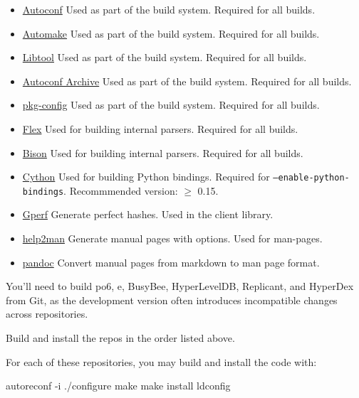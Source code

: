 \begin{itemize}
\item \href{http://www.gnu.org/software/autoconf/}{Autoconf} Used as part of
    the build system.  Required for all builds.
\item \href{http://www.gnu.org/software/automake/}{Automake} Used as part of
    the build system.  Required for all builds.
\item \href{http://www.gnu.org/software/libtool/}{Libtool} Used as part of the
    build system.  Required for all builds.
\item \href{http://www.gnu.org/software/autoconf-archive/}{Autoconf Archive}
    Used as part of the build system.  Required for all builds.
\item \href{http://www.freedesktop.org/wiki/Software/pkg-config/}{pkg-config}
    Used as part of the build system.  Required for all builds.
\item \href{http://flex.sourceforge.net/}{Flex} Used for building internal
    parsers.  Required for all builds.
\item \href{http://www.gnu.org/software/bison/}{Bison} Used for building
    internal parsers.  Required for all builds.
\item \href{http://cython.org/}{Cython} Used for building Python bindings.
    Required for \texttt{--enable-python-bindings}.
    Recommmended version: $\ge$ 0.15.
\item \href{http://www.gnu.org/software/gperf/}{Gperf}  Generate perfect
    hashes.  Used in the client library.
\item \href{http://www.gnu.org/software/help2man/}{help2man}  Generate manual
    pages with options.  Used for man-pages.
\item \href{http://johnmacfarlane.net/pandoc/}{pandoc}  Convert manual pages
    from markdown to man page format.
\end{itemize}

You'll need to build po6, e, BusyBee, HyperLevelDB, Replicant, and HyperDex from
Git, as the development version often introduces incompatible changes across
repositories.

Build and install the repos in the order listed above.

For each of these repositories, you may build and install the code with:

\begin{consolecode}
autoreconf -i
./configure
make
make install
ldconfig
\end{consolecode}

